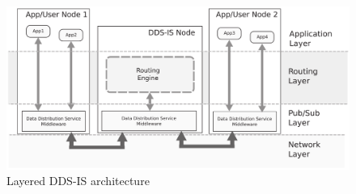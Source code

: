 \begin{figure}[ht!]
	\centering
	\includegraphics[scale=0.18]{middleware/DDSISarchitecture.png}
	\caption{Layered DDS-IS architecture}
	\label{fig:DDSISarchitecture}
\end{figure}

